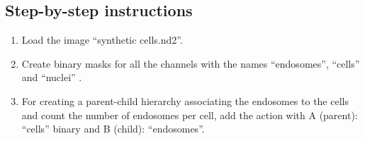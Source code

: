 \subsection{Step-by-step instructions}

\begin{enumerate}
    \item Load the image ``synthetic cells.nd2''.

    \item Create binary masks for all the channels with the names ``endosomes'', ``cells'' and ``nuclei'' . 

    \item For creating a parent-child hierarchy associating the endosomes to the cells and count the number of endosomes per cell, add the action  with A (parent): ``cells'' binary and B (child): ``endosomes''. 




\end{enumerate}

